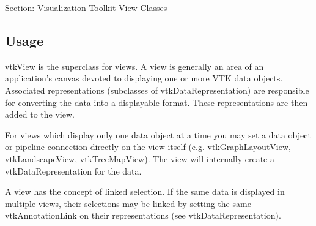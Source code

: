 Section\-: \hyperlink{sec_vtkviews}{Visualization Toolkit View Classes} \hypertarget{vtkwidgets_vtkxyplotwidget_Usage}{}\subsection{Usage}\label{vtkwidgets_vtkxyplotwidget_Usage}
vtk\-View is the superclass for views. A view is generally an area of an application's canvas devoted to displaying one or more V\-T\-K data objects. Associated representations (subclasses of vtk\-Data\-Representation) are responsible for converting the data into a displayable format. These representations are then added to the view.

For views which display only one data object at a time you may set a data object or pipeline connection directly on the view itself (e.\-g. vtk\-Graph\-Layout\-View, vtk\-Landscape\-View, vtk\-Tree\-Map\-View). The view will internally create a vtk\-Data\-Representation for the data.

A view has the concept of linked selection. If the same data is displayed in multiple views, their selections may be linked by setting the same vtk\-Annotation\-Link on their representations (see vtk\-Data\-Representation).

